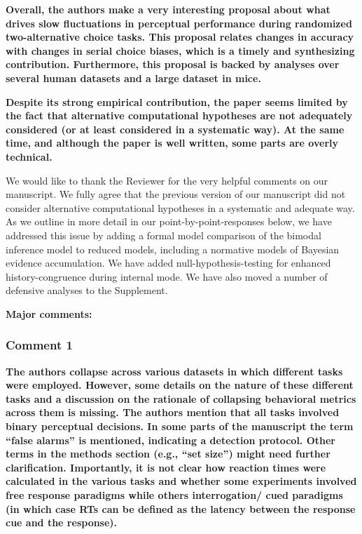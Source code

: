\documentclass[
]{article}
\begin{document}
\textbf{Overall, the authors make a very interesting proposal about what
drives slow fluctuations in perceptual performance during randomized
two-alternative choice tasks. This proposal relates changes in accuracy
with changes in serial choice biases, which is a timely and synthesizing
contribution. Furthermore, this proposal is backed by analyses over
several human datasets and a large dataset in mice.}

\textbf{Despite its strong empirical contribution, the paper seems
limited by the fact that alternative computational hypotheses are not
adequately considered (or at least considered in a systematic way). At
the same time, and although the paper is well written, some parts are
overly technical.}

We would like to thank the Reviewer for the very helpful comments on our
manuscript. We fully agree that the previous version of our manuscript
did not consider alternative computational hypotheses in a systematic
and adequate way. As we outline in more detail in our
point-by-point-responses below, we have addressed this issue by adding a
formal model comparison of the bimodal inference model to reduced
models, including a normative models of Bayesian evidence accumulation.
We have added null-hypothesis-testing for enhanced history-congruence
during internal mode. We have also moved a number of defensive analyses
to the Supplement.

\textbf{Major comments:}

\hypertarget{comment-1-2}{%
\subsubsection{Comment 1}\label{comment-1-2}}

\textbf{The authors collapse across various datasets in which different
tasks were employed. However, some details on the nature of these
different tasks and a discussion on the rationale of collapsing
behavioral metrics across them is missing. The authors mention that all
tasks involved binary perceptual decisions. In some parts of the
manuscript the term ``false alarms'' is mentioned, indicating a
detection protocol. Other terms in the methods section (e.g., ``set
size'') might need further clarification. Importantly, it is not clear
how reaction times were calculated in the various tasks and whether some
experiments involved free response paradigms while others interrogation/
cued paradigms (in which case RTs can be defined as the latency between
the response cue and the response).}
\end{document}
